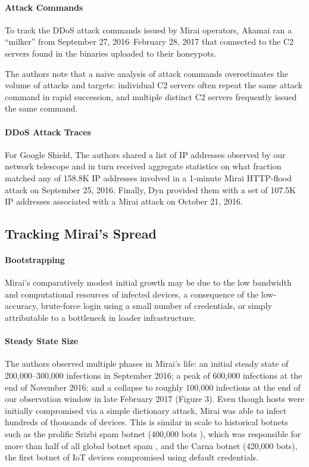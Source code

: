 \documentclass[conference]{IEEEtran}
\begin{document}
\paragraph{\textbf{Attack Commands}}
To track the DDoS attack commands issued by Mirai
operators, Akamai ran a “milker” from September 27,
2016–February 28, 2017 that connected to the C2 servers found in the binaries uploaded to their honeypots. 

The authors \cite{b1}note that a naive analysis of attack
commands overestimates the volume of attacks and targets:
individual C2 servers often repeat the same attack
command in rapid succession, and multiple distinct C2
servers frequently issued the same command. 
\paragraph{\textbf{DDoS Attack Traces}}

For Google Shield, The authors \cite{b1} shared a list of IP addresses
observed by our network telescope and in turn
received aggregate statistics on what fraction matched
any of 158.8K IP addresses involved in a 1-minute Mirai
HTTP-flood attack on September 25, 2016. Finally, Dyn
provided them with a set of 107.5K IP addresses associated
with a Mirai attack on October 21, 2016.

\subsection{\textbf{Tracking Mirai's Spread}}

\paragraph{\textbf{Bootstrapping}}
Mirai’s comparatively modest initial
growth may be due to the low bandwidth and computational
resources of infected devices, a consequence of the
low-accuracy, brute-force login using a small number of
credentials, or simply attributable to a bottleneck in loader
infrastructure.
\paragraph{\textbf{Steady State Size}}
The authors \cite{b1} observed multiple phases in Mirai’s life: an initial
steady state of 200,000–300,000 infections in September
2016; a peak of 600,000 infections at the end of November
2016; and a collapse to roughly 100,000 infections at
the end of our observation window in late February 2017
(Figure 3). Even though hosts were initially compromised
via a simple dictionary attack, Mirai was able to infect
hundreds of thousands of devices. This is similar in scale
to historical botnets such as the prolific Srizbi spam botnet
(400,000 bots ), which was responsible for more
than half of all global botnet spam , and the Carna
botnet (420,000 bots), the first botnet of IoT devices
compromised using default credentials.
\end{document}
